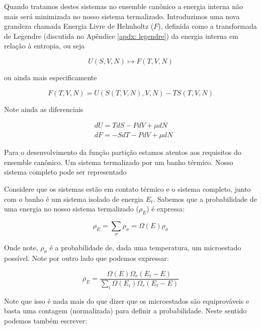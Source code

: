 Quando tratamos destes sistemas no ensemble canônico a energia interna não mais será minimizada no nosso sistema termalizado. Introduzimos uma nova grandeza chamada Energia Livre de Helmholtz ($F$), definida como a transformada de Legendre (discutida no Apêndice \ref{apdx: legendre}) da energia interna em relação à entropia, ou seja

\begin{equation}
	U(S,V,N) \mapsto F(T, V, N)
\end{equation}

ou ainda mais especificamente

\[
F(T, V, N) = U(S(T,V,N), V, N) - T S(T,V,N) 
\]

Note ainda as diferenciais

\begin{align*}
	& dU = TdS - PdV + \mu dN \\
	& dF = -SdT - PdV + \mu dN
\end{align*}

Para o desenvolvimento da função partição estamos atentos aos requisitos do ensemble canônico. Um sistema termalizado por um banho térmico. Nosso sistema completo pode ser representado

\begin{center}
\end{center}

Considere que os sistemas estão em contato térmico e o sistema completo, junto com o banho é um sistema isolado de energia $E_t$. Sabemos que a probabilidade de uma energia no nosso sistema termalizado ($\rho_E$) é expressa:

\[
\rho_E = \sum_{\sigma} \rho_\sigma = \Omega(E)\rho_\sigma
\]

Onde note, $\rho_\sigma$ é a probabilidade de, dada uma temperatura, um microestado possível. Note por outro lado que podemos expressar:

\[
\rho_E = \frac{\Omega(E) \Omega_r (E_t - E)}{\sum_{i} \Omega(E_i) \Omega_r(E_t-E)}
\]

Note que isso é nada mais do que dizer que os microestados são equiprováveis e basta uma contagem (normalizada) para definir a probabilidade. Neste sentido podemos também escrever:

